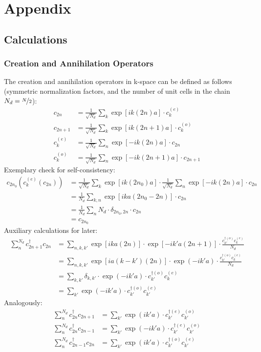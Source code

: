 \chapter{Appendix}
\section{Calculations}
\subsection{Creation and Annihilation Operators}
The creation and annihilation operators in k-space can be defined as follows (symmetric normalization factors, and the number of unit cells in the chain $N_d = \nicefrac{N}{2}$):
\begin{align}
c_{2n} &= \frac{1}{\sqrt{N_d}}\sum_k\exp\left[ik\left(2n\right)a\right]\cdot c_{k}^{(e)}\\
c_{2n+1} &= \frac{1}{\sqrt{N_d}}\sum_k\exp\left[ik\left(2n+1\right)a\right]\cdot c_{k}^{(o)}\\
c_k^{(e)} &= \frac{1}{\sqrt{N_d}}\sum_n \exp\left[-ik\left(2n\right)a\right]\cdot c_{2n}\\
c_k^{(o)} &= \frac{1}{\sqrt{N_d}}\sum_n \exp\left[-ik\left(2n+1\right)a\right]\cdot c_{2n+1}
\end{align}
Exemplary check for self-consistency:
\begin{align}
c_{2n_0}\left(c_k^{(e)}(c_{2n})\right) &= \frac{1}{\sqrt{N_d}}\sum_k\exp\left[ik\left(2n_0\right)a\right]\cdot \frac{1}{\sqrt{N_d}}\sum_n \exp\left[-ik\left(2n\right)a\right]\cdot c_{2n}\\
&= \frac{1}{N_d}\sum_{k, n} \exp\left[ika\left(2n_0-2n\right)\right]\cdot c_{2n}\\
&= \frac{1}{N_d}\sum_n N_d\cdot \delta_{2n_0,2n}\cdot c_{2n}\\
&= c_{2n_0}
\end{align}
Auxiliary calculations for later:
\begin{align}
\sum_n^{N_d}c_{2n+1}^\dagger c_{2n} &=\sum_{n, k, k'} \exp\left[ika(2n)\right] \cdot \exp\left[-ik'a(2n+1)\right] \cdot \frac{c_{k'}^{\dagger(o)}c_k^{(e)}}{N_d} \\
&=\sum_{n, k, k'} \exp\left[ia(k-k')(2n)\right] \cdot \exp\left(-ik'a\right) \cdot  \frac{c_{k'}^{\dagger(o)}c_k^{(e)}}{N_d} \\
&=\sum_{k, k'} \delta_{k, k'} \cdot \exp\left(-ik'a\right)\cdot c_{k'}^{\dagger(o)}c_k^{(e)}\\
&=\sum_{k'} \exp\left(-ik'a\right) \cdot c_{k'}^{\dagger(o)}c_{k'}^{(e)}
\end{align}
Analogously:
\begin{align}
\sum_n^{N_d} c_{2n}^\dagger c_{2n+1} &=\sum_{k'} \exp\left(ik'a\right)\cdot c_{k'}^{\dagger(e)}c_{k'}^{(o)}\\
\sum_n^{N_d} c_{2n}^\dagger c_{2n-1}&=\sum_{k'} \exp\left(-ik'a\right)\cdot  c_{k'}^{\dagger(e)}c_{k'}^{(o)}\\
\sum_n^{N_d} c_{2n-1}^\dagger c_{2n} &=\sum_{k'} \exp\left(ik'a\right)\cdot  c_{k'}^{\dagger(o)}c_{k'}^{(e)}
\end{align}
